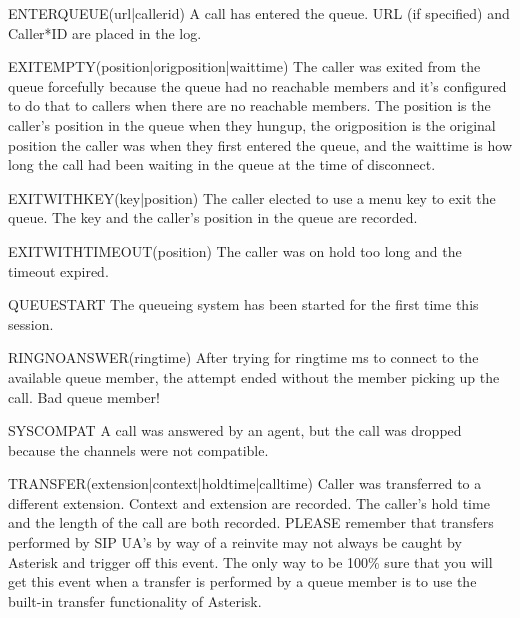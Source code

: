 ENTERQUEUE(url|callerid)
A call has entered the queue.  URL (if specified) and Caller*ID are placed
in the log.

EXITEMPTY(position|origposition|waittime)
The caller was exited from the queue forcefully because the queue had no
reachable members and it's configured to do that to callers when there
are no reachable members. The position is the caller's position in the
queue when they hungup, the origposition is the original position the 
caller was when they first entered the queue, and the waittime is how 
long the call had been waiting in the queue at the time of disconnect.

EXITWITHKEY(key|position)
The caller elected to use a menu key to exit the queue.  The key and
the caller's position in the queue are recorded.

EXITWITHTIMEOUT(position)
The caller was on hold too long and the timeout expired.

QUEUESTART
The queueing system has been started for the first time this session.

RINGNOANSWER(ringtime)
After trying for ringtime ms to connect to the available queue member,
the attempt ended without the member picking up the call. Bad queue
member!

SYSCOMPAT
A call was answered by an agent, but the call was dropped because the 
channels were not compatible.

TRANSFER(extension|context|holdtime|calltime)
Caller was transferred to a different extension.  Context and extension
are recorded. The caller's hold time and the length of the call are both
recorded. PLEASE remember that transfers performed by SIP UA's by way
of a reinvite may not always be caught by Asterisk and trigger off this
event. The only way to be 100\% sure that you will get this event when
a transfer is performed by a queue member is to use the built-in transfer
functionality of Asterisk.

